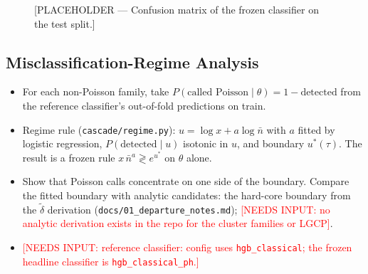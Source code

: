 \documentclass[twoside]{article}
\newcommand{\NI}[1]{\textcolor{red}{[NEEDS INPUT: #1]}}
\newcommand{\src}[1]{{\footnotesize\texttt{#1}}}
\newcommand{\nb}{\bar n}
\begin{document}
\begin{figure}[t]
\vspace{.3in}
\centerline{}
\vspace{.3in}
\caption{[PLACEHOLDER — Confusion matrix of the frozen classifier on the test split.]}
\label{fig:confusion}
\end{figure}

\subsection{Misclassification-Regime Analysis}
\begin{itemize}
  \item For each non-Poisson family, take $P(\text{called Poisson}\mid\theta)=1-\text{detected}$ from the reference
        classifier's out-of-fold predictions on train.
  \item Regime rule (\src{cascade/regime.py}): $u=\log x+a\log\nb$ with $a$ fitted by logistic regression,
        $P(\text{detected}\mid u)$ isotonic in $u$, and boundary $u^\ast(\tau)$. The result is a frozen rule
        $x\,\nb^{a}\gtrless e^{u^\ast}$ on $\theta$ alone.
  \item Show that Poisson calls concentrate on one side of the boundary. Compare the fitted boundary with analytic
        candidates: the hard-core boundary from the $\tilde\delta$ derivation (\src{docs/01\_departure\_notes.md});
        \NI{no analytic derivation exists in the repo for the cluster families or LGCP}.
  \item \NI{reference classifier: config uses \texttt{hgb\_classical}; the frozen headline classifier is
        \texttt{hgb\_classical\_ph}.}
\end{itemize}
\end{document}
